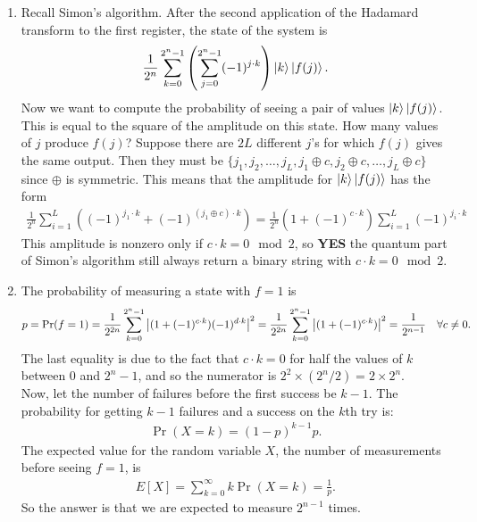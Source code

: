 \documentclass{article}
\theoremstyle{definition}
\newcommand{\f}[2]{\frac{#1}{#2}}
\newcommand{\lp}{\left(}
\newcommand{\rp}{\right)}
\begin{document}
\begin{enumerate}[label=(\alph*)]
	\item Recall Simon's algorithm. After the second application of the Hadamard transform to the first register, the state of the system is 
	\begin{align*}
		\f{1}{2^n} \sum_{k=0}^{2^n-1} \lp \sum_{j=0}^{2^n-1} (-1)^{j\cdot k} \rp \ket{k} \ket{f(j)}.
	\end{align*}
	Now we want to compute the probability of seeing a pair of values $\ket{k} \ket{f(j)}$. This is equal to the square of the amplitude on this state. How many values of $j$ produce $f(j)$? Suppose there are $2L$ different $j$'s for which $f(j)$ gives the same output. Then they must be $\{  j_1, j_2,\dots, j_L, j_1\oplus c, j_2\oplus c, \dots, j_L\oplus c \}$ since $\oplus$ is symmetric. This means that the amplitude for $\ket{k}\ket{f(j)}$ has the form
	\begin{align*}
		\f{1}{2^n} \sum_{i=1}^L \lp (-1)^{j_1\cdot k} + (-1)^{{(j_1\oplus c)}\cdot k }\rp = \f{1}{2^n}(1 + (-1)^{c\cdot k}) \sum_{i=1}^L (-1)^{j_i\cdot k}
	\end{align*}
	This amplitude is nonzero only if $c\cdot k = 0 \mod 2$, so \textbf{YES} the quantum part of Simon's algorithm still always return a binary string with $c\cdot k = 0 \mod 2$. 
	
	\item The probability of measuring a state with $f=1$ is 
	\begin{align*}
		p = \Pr(f=1) = \f{1}{2^{2n}}\sum_{k=0}^{2^n-1} \abs{ (1+(-1)^{c\cdot k})(-1)^{d\cdot k}}^2 = 
		\f{1}{2^{2n}}\sum_{k=0}^{2^n-1} \abs{ (1+(-1)^{c\cdot k})}^2 = \f{1}{2^{n-1}}\quad \forall c\neq 0.
	\end{align*}
	The last equality is due to the fact that $c\cdot k = 0$ for half the values of $k$ between $0$ and $2^n-1$, and so the numerator is $2^2\times(2^n/2) = 2\times 2^n$. \\ 

	Now, let the number of failures before the first success be $k-1$. The probability for getting $k-1$ failures and a success on the $k$th try is: 
	\begin{align*}
		\Pr(X=k) = (1-p)^{k-1}p.
	\end{align*}
	The expected value for the random variable $X$, the number of measurements before seeing $f=1$, is 
	\begin{align*}
		E[X] = \sum_{k=0}^\infty k \Pr(X=k) = \f{1}{p}.
	\end{align*}
	So the answer is that we are expected to measure  $\boxed{2^{n-1}}$  times. \\
	

\end{enumerate}
\end{document}
